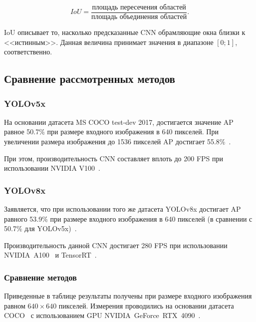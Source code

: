 \begin{equation}
	IoU = \frac{\text{площадь пересечения областей}}{\text{площадь объединения областей}}.
\end{equation}

IoU описывает то, насколько предсказанные CNN обрамляющие окна близки к <<истинным>>. Данная величина принимает значения в диапазоне $[0;1]$, соответственно.

\subsection{Сравнение рассмотренных методов}

\subsubsection*{YOLOv5x}

На основании датасета MS COCO test-dev 2017, достигается значение AP равное 50.7\% при размере входного изображения в 640 пикселей. При увеличении размера изображения до 1536 пикселей AP достигает 55.8\%~\cite{yolo-review-2023}. 

При этом, производительность CNN составляет вплоть до 200 FPS при использовании NVIDIA V100~\cite{nvidia-v100}.

\subsubsection*{YOLOv8x}

Заявляется, что при использовании того же датасета YOLOv8x достигает AP равного 53.9\% при размере входного изображения в 640 пикселей (в сравнении с 50.7\% для YOLOv5x)~\cite{yolo-review-2023}.

Производительность данной CNN достигает 280 FPS при использовании NVIDIA~A100~\cite{nvidia-a100} и TensorRT~\cite{nvidia-tensorrt}.

\subsubsection*{Сравнение методов}

Приведенные в таблице результаты получены при размере входного изображения равном $640 \times 640$ пикселей. Измерения проводились на основании датасета COCO~\cite{coco-benchmark} с использованием GPU NVIDIA~GeForce~RTX~4090~\cite{rtx4090}.

